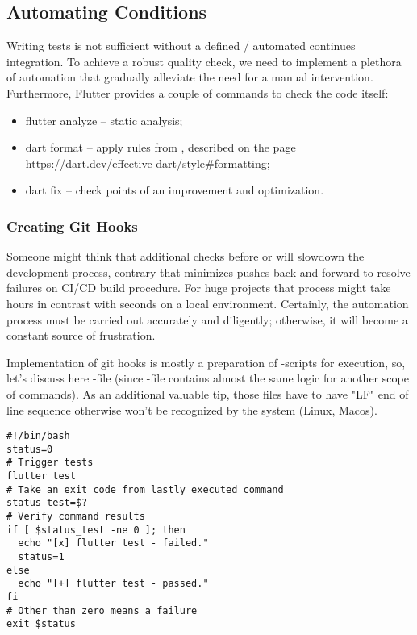 
\newpage
\subsection{Automating Conditions}

Writing tests is not sufficient without a defined / automated continues integration. To achieve a robust quality check,
we need to implement a plethora of automation that gradually alleviate the need for a manual intervention. Furthermore,
Flutter provides a couple of commands to check the code itself:

\begin{itemize}
  \item flutter analyze -- static analysis;
  \item dart format -- apply rules from , described on the page
  \href{https://dart.dev/effective-dart/style\#formatting}{https://dart.dev/effective-dart/style\#formatting};
  \item dart fix -- check points of an improvement and optimization.
\end{itemize}


\subsubsection{Creating Git Hooks}

Someone might think that additional checks before  or  will slowdown the development process,
contrary that minimizes pushes back and forward to resolve failures on CI/CD build procedure. For huge projects
that process might take hours in contrast with seconds on a local environment. Certainly, the automation process must be
carried out accurately and diligently; otherwise, it will become a constant source of frustration.

Implementation of git hooks is mostly a preparation of -scripts for execution, so, let's discuss here
-file (since -file contains almost the same logic for another scope of commands). As an
additional valuable tip, those files have to have "LF" end of line sequence otherwise won't be recognized by the system
(Linux, Macos).

\begin{lstlisting}[language=terminal]
#!/bin/bash
status=0
# Trigger tests
flutter test
# Take an exit code from lastly executed command
status_test=$?
# Verify command results
if [ $status_test -ne 0 ]; then
  echo "[x] flutter test - failed."
  status=1
else
  echo "[+] flutter test - passed."
fi
# Other than zero means a failure
exit $status
\end{lstlisting}

